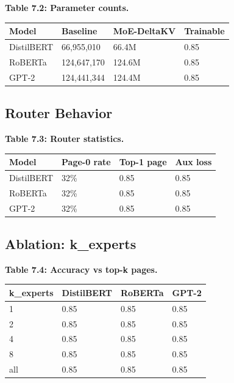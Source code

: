 \textbf{Table 7.2: Parameter counts.}

\begin{table}[H]
\centering
\small
\begin{tabular}{llll}
\toprule
\textbf{Model} & \textbf{Baseline} & \textbf{MoE-DeltaKV} & \textbf{Trainable} \\
\midrule
DistilBERT & 66,955,010 & 66.4M & 0.85 \\
RoBERTa & 124,647,170 & 124.6M & 0.85 \\
GPT-2 & 124,441,344 & 124.4M & 0.85 \\
\bottomrule
\end{tabular}
\end{table}

\subsection{Router Behavior}

\textbf{Table 7.3: Router statistics.}

\begin{table}[H]
\centering
\small
\begin{tabular}{llll}
\toprule
\textbf{Model} & \textbf{Page-0 rate} & \textbf{Top-1 page} & \textbf{Aux loss} \\
\midrule
DistilBERT & 32\% & 0.85 & 0.85 \\
RoBERTa & 32\% & 0.85 & 0.85 \\
GPT-2 & 32\% & 0.85 & 0.85 \\
\bottomrule
\end{tabular}
\end{table}

\subsection{Ablation: k\_experts}

\textbf{Table 7.4: Accuracy vs top-k pages.}

\begin{table}[H]
\centering
\small
\begin{tabular}{llll}
\toprule
\textbf{k\_experts} & \textbf{DistilBERT} & \textbf{RoBERTa} & \textbf{GPT-2} \\
\midrule
1 & 0.85 & 0.85 & 0.85 \\
2 & 0.85 & 0.85 & 0.85 \\
4 & 0.85 & 0.85 & 0.85 \\
8 & 0.85 & 0.85 & 0.85 \\
all & 0.85 & 0.85 & 0.85 \\
\bottomrule
\end{tabular}
\end{table}

